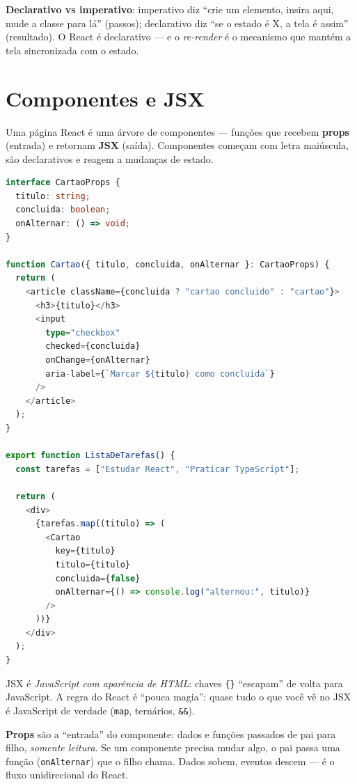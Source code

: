 \begin{caixaconceito}
\textbf{Declarativo vs imperativo}: imperativo diz ``crie um elemento, insira
aqui, mude a classe para lá'' (passos); declarativo diz ``se o estado é X, a
tela é assim'' (resultado). O React é declarativo — e o \emph{re-render} é o
mecanismo que mantém a tela sincronizada com o estado.
\end{caixaconceito}

\section{Componentes e JSX}

Uma página React é uma árvore de componentes — funções que recebem
\textbf{props} (entrada) e retornam \textbf{JSX} (saída). Componentes começam
com letra maiúscula, são declarativos e reagem a mudanças de estado.

\begin{lstlisting}[style=livro, language=TypeScript,
  caption={Componente com props tipadas e composição.}, label={list:react-componente}]
interface CartaoProps {
  titulo: string;
  concluida: boolean;
  onAlternar: () => void;
}

function Cartao({ titulo, concluida, onAlternar }: CartaoProps) {
  return (
    <article className={concluida ? "cartao concluido" : "cartao"}>
      <h3>{titulo}</h3>
      <input
        type="checkbox"
        checked={concluida}
        onChange={onAlternar}
        aria-label={`Marcar ${titulo} como concluída`}
      />
    </article>
  );
}

export function ListaDeTarefas() {
  const tarefas = ["Estudar React", "Praticar TypeScript"];

  return (
    <div>
      {tarefas.map((titulo) => (
        <Cartao
          key={titulo}
          titulo={titulo}
          concluida={false}
          onAlternar={() => console.log("alternou:", titulo)}
        />
      ))}
    </div>
  );
}
\end{lstlisting}

\begin{caixadica}
JSX é \emph{JavaScript com aparência de HTML}: chaves \texttt{\{\}} ``escapam''
de volta para JavaScript. A regra do React é ``pouca magia'': quase tudo o que
você vê no JSX é JavaScript de verdade (\texttt{map}, ternários,
\texttt{\&\&}).
\end{caixadica}

\begin{caixaconceito}
\textbf{Props} são a ``entrada'' do componente: dados e funções passados de
pai para filho, \emph{somente leitura}. Se um componente precisa mudar algo, o
pai passa uma função (\texttt{onAlternar}) que o filho chama. Dados sobem,
eventos descem — é o fluxo unidirecional do React.
\end{caixaconceito}

